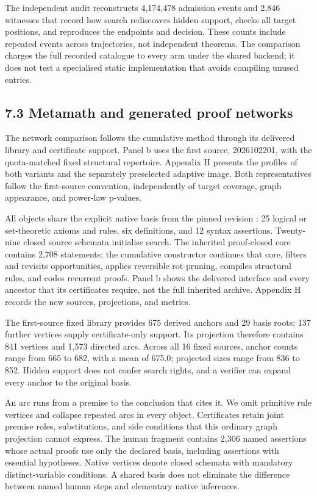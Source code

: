 \documentclass[pdflatex,sn-basic,Numbered]{sn-jnl}
\begin{document}
The independent audit reconstructs 4,174,478 admission events and 2,846 witnesses that record how search rediscovers hidden support, checks all target positions, and reproduces the endpoints and decision. These counts include repeated events across trajectories, not independent theorems. The comparison charges the full recorded catalogue to every arm under the shared backend; it does not test a specialised static implementation that avoids compiling unused entries.

\subsection*{7.3 Metamath and generated proof networks}\label{metamath-and-generated-proof-networks}

The network comparison follows the cumulative method through its delivered library and certificate support. Panel b uses the first source, 2026102201, with the quota-matched fixed structural repertoire. Appendix H presents the profiles of both variants and the separately preselected adaptive image. Both representatives follow the first-source convention, independently of target coverage, graph appearance, and power-law p-values.

All objects share the explicit native basis from the pinned  revision \citep{MetamathSetMMPinned}: 25 logical or set-theoretic axioms and rules, six definitions, and 12 syntax assertions. Twenty-nine closed source schemata initialise search. The inherited proof-closed core contains 2,708 statements; the cumulative constructor continues that core, filters and revisits opportunities, applies reversible rot-pruning, compiles structural rules, and codes recurrent proofs. Panel b shows the delivered interface and every ancestor that its certificates require, not the full inherited archive. Appendix H records the new sources, projections, and metrics.

The first-source fixed library provides 675 derived anchors and 29 basis roots; 137 further vertices supply certificate-only support. Its projection therefore contains 841 vertices and 1,573 directed arcs. Across all 16 fixed sources, anchor counts range from 665 to 682, with a mean of 675.0; projected sizes range from 836 to 852. Hidden support does not confer search rights, and a verifier can expand every anchor to the original basis.

An arc runs from a premise to the conclusion that cites it. We omit primitive rule vertices and collapse repeated arcs in every object. Certificates retain joint premise roles, substitutions, and side conditions that this ordinary graph projection cannot express. The human fragment contains 2,306 named assertions whose actual proofs use only the declared basis, including assertions with essential hypotheses. Native vertices denote closed schemata with mandatory distinct-variable conditions. A shared basis does not eliminate the difference between named human steps and elementary native inferences.
\end{document}
